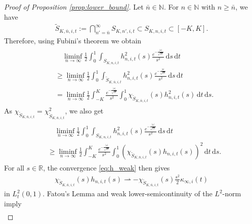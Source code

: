 \documentclass[11pt]{article}
\numberwithin{statement}{section}
\numberwithin{equation}{section}
\theoremstyle{remark}
\newcommand{\R}{\mathbb R} 				%
\newcommand{\N}{\mathbb N}
\newcommand{\intd}{\, \mathrm{d}} 				%
\newcommand{\warr}{\rightharpoonup}				%
\begin{document}
\begin{proof}[Proof of Proposition \ref{prop:lower_bound}]
	Let $\bar n \in \N$. For $n \in \N$ with $n \geq \bar n$, we
        have
        \begin{align}
          \tilde S_{K,\bar n, i,t}:= \bigcap_{n'= \bar n} ^\infty S_{K, n',i,t}
          \subset S_{K,n,i,t} \subset [-K,K].
        \end{align}
        Therefore,
        using Fubini's theorem we obtain
	\begin{align}
	  \begin{split}
            & \quad \liminf_{n \to \infty} \frac{1}{2} \int_0^1 \int_{
              S_{K,n,i,t}}
            h^2_{n,i,t}(s)  \frac{e^{- \frac{|s|}{\sqrt{2\pi}} }}{s^2} \intd s \intd t\\
            & \geq \liminf_{n \to \infty} \frac{1}{2} \int_0^1 \int_{
              \tilde S_{K,\bar n, i,t}}
            h^2_{n,i,t}(s)  \frac{e^{- \frac{|s|}{\sqrt{2\pi}}}}{s^2}\intd s \intd t\\
            & = \liminf_{n \to \infty} \frac{1}{2} \int_{-K}^K
            \frac{e^{- \frac{|s|}{\sqrt{2\pi}}}}{s^2} \int_0^1
            \chi_{\tilde S_{K,\bar n, i,t}} (s) h^2_{n,i,t}(s)\intd t
            \intd s.
           \end{split}
	\end{align}
	As
        $\chi_{\tilde S_{K,\bar n, i,t}} = \chi^2_{\tilde S_{K,\bar n,
            i,t}}$, we also get
	\begin{align}\label{eq:5.100}
	  \begin{split}
            & \quad \liminf_{n \to \infty} \frac{1}{2} \int_0^1 \int_{
              S_{K,n,i,t}}
            h^2_{n,i,t}(s)  \frac{e^{- \frac{|s|}{\sqrt{2\pi}} }}{s^2} \intd s \intd t\\
            & \geq \liminf_{n \to \infty} \frac{1}{2} \int_{-K}^K
            \frac{e^{- \frac{|s|}{\sqrt{2\pi}}}}{s^2} \int_0^1 \left(
              \chi_{\tilde S_{K,\bar n, i,t}} (s)
              h_{n,i,t}(s)\right)^2 \intd t \intd s.
           \end{split}
	\end{align}
	For all $s\in \R$, the convergence \eqref{eq:h_weak} then gives
	\begin{align}
          \chi_{\tilde S_{K,\bar n, i,t}} (s)
          h_{n,i,t}(s) \warr -  \chi_{\tilde S_{K,\bar n, i,t}} (s) \frac{s^2}{2}
          \kappa_{\infty,i}(t) 
         \end{align}
         in $L_t^2(0,1)$.  Fatou's Lemma and weak lower-semicontinuity
         of the $L^2$-norm imply
        	\begin{align}

\end{align}
\end{proof}
\end{document}
